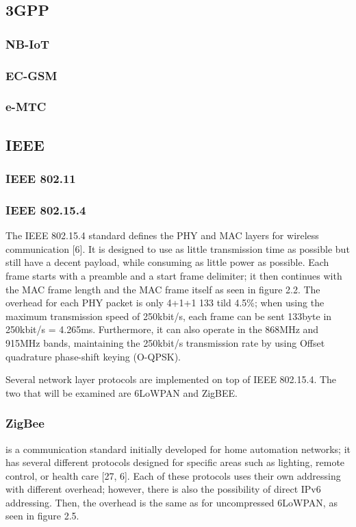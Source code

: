 \subsection{3GPP}
\subsubsection{NB-IoT}
\subsubsection{EC-GSM}
\subsubsection{e-MTC}


\subsection{IEEE}
\subsubsection{IEEE 802.11}

\subsubsection{IEEE 802.15.4}
The IEEE 802.15.4 standard defines the PHY and MAC layers for wireless communication [6].
It is designed to use as little transmission time as possible but still have a decent payload,
	while consuming as little power as possible.
Each frame starts with a preamble and a start frame delimiter;
	it then continues with the MAC frame length and the MAC frame itself as seen in figure 2.2.
The overhead for each PHY packet is only 4+1+1 133 tild 4.5\%;
	when
using the maximum transmission speed of 250kbit/s,
	each frame can be sent 133byte in 250kbit/s = 4.265ms.
Furthermore,
	it can also operate in the 868MHz and 915MHz bands,
	maintaining the 250kbit/s transmission rate by using Offset quadrature phase-shift keying (O-QPSK).

Several network layer protocols are implemented on top of IEEE 802.15.4.
The two that will be examined are 6LoWPAN and ZigBEE.

\subsubsection{ZigBee} 
is a communication standard initially developed for home automation
networks; it has several different protocols designed for specific areas such
as lighting, remote control, or health care [27, 6]. Each of these protocols
uses their own addressing with different overhead; however, there is also the
possibility of direct IPv6 addressing. Then, the overhead is the same as for
uncompressed 6LoWPAN, as seen in figure 2.5.

